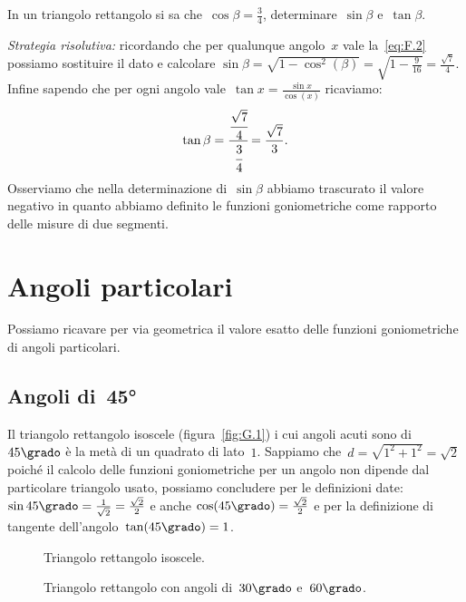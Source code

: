 \begin{exrig}
 \begin{esempio}
In un triangolo rettangolo si sa che~$\cos \beta=\frac{3}{4}$, 
determinare~$\sin \beta$ e~$\tan \beta$.

\emph{Strategia risolutiva:}
ricordando che per qualunque angolo~$x$ vale la~\ref{eq:F.2} possiamo sostituire 
il dato e calcolare
$\sin \beta=\sqrt{1-\cos ^{2}(\beta 
)}=\sqrt{1-\frac{9}{16}}=\frac{\sqrt{7}}{4}$. 
Infine sapendo che per ogni angolo vale~$\tan x=\frac{\sin x}{\cos (x)}$ 
ricaviamo:
\[\tan \beta=\cfrac{\cfrac{\sqrt{7}}{4}}{\cfrac{3}{4}}=\frac{\sqrt{7}}{3}.\]
Osserviamo che nella determinazione di~$\sin \beta$ abbiamo trascurato il valore 
negativo in quanto abbiamo definito
le funzioni goniometriche come rapporto delle misure di due segmenti.
 \end{esempio}
\end{exrig}

\ovalbox{\risolvi \ref{ese:G.2}}

\section{Angoli particolari}
\label{sec:trigo_angoliparticolari}
Possiamo ricavare per via geometrica il valore esatto delle funzioni 
goniometriche di angoli particolari.

\subsection{Angoli di~45°}

 Il triangolo rettangolo isoscele (figura~\ref{fig:G.1}) i cui angoli acuti sono 
di~$45\grado$ è la metà di un quadrato di lato~$1$.
Sappiamo che~$d=\sqrt{1^{2}+1^{2}}=\sqrt{2}$ poiché il calcolo delle funzioni 
goniometriche per un angolo
non dipende dal particolare triangolo usato, possiamo concludere per le 
definizioni date:
$\sin 45\grado=\frac{1}{\sqrt{2}}=\frac{\sqrt{2}}{2}$ e anche
$\cos (45\grado)=\frac{\sqrt{2}}{2}$ e per la definizione di tangente 
dell'angolo~$\tan (45\grado)=1$.%

\begin{inaccessibleblock}
 \begin{figure}[t]
\begin{minipage}[t]{.45\textwidth}
 \centering
 
 \caption{Triangolo rettangolo isoscele.}\label{fig:G.1}
\end{minipage}\hfil
\begin{minipage}[t]{.45\textwidth}
 \centering
 
 \caption{Triangolo rettangolo con angoli di~$30\grado$ 
e~$60\grado$.}\label{fig:G.2}
\end{minipage}
\end{figure}
\end{inaccessibleblock}


